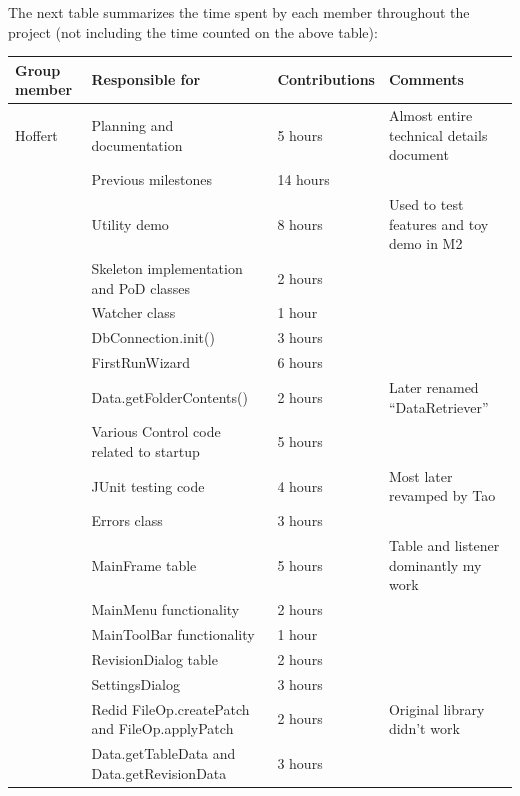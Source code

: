 \documentclass[12pt,a4paper]{article}
\begin{document}
The next table summarizes the time spent by each member throughout the project (not including the time counted on the above table):

\begin{longtable}{| p{2cm} | p{5cm} | p{3cm}| p{4.5cm} |}
  \hline
  \textbf{Group member} & \textbf{Responsible for} & \textbf{Contributions} & \textbf{Comments} \\ \hline
  Hoffert & Planning and documentation & 5 hours & Almost entire technical details document\\ \cline{2-4}
   & Previous milestones & 14 hours & \\ \cline{2-4}
   & Utility demo & 8 hours & Used to test features and toy demo in M2 \\ \cline{2-4}
   & Skeleton implementation and PoD classes & 2 hours & \\ \cline{2-4}
   & Watcher class & 1 hour & \\ \cline{2-4}
   & DbConnection.init() & 3 hours & \\ \cline{2-4}
   & FirstRunWizard & 6 hours & \\ \cline{2-4}
   & Data.getFolderContents() & 2 hours & Later renamed ``DataRetriever'' \\ \cline{2-4}
   & Various Control code related to startup & 5 hours & \\ \cline{2-4}
   & JUnit testing code & 4 hours & Most later revamped by Tao \\ \cline{2-4}
   & Errors class & 3 hours & \\ \cline{2-4}
   & MainFrame table & 5 hours & Table and listener dominantly my work \\ \cline{2-4}
   & MainMenu functionality & 2 hours & \\ \cline{2-4}
   & MainToolBar functionality & 1 hour & \\ \cline{2-4}
   & RevisionDialog table & 2 hours & \\ \cline{2-4}
   & SettingsDialog & 3 hours & \\ \cline{2-4}
   & Redid FileOp.createPatch and FileOp.applyPatch & 2 hours & Original library didn't work \\ \cline{2-4}
   & Data.getTableData and Data.getRevisionData & 3 hours & \\ \cline{2-4}

\end{longtable}
\end{document}
